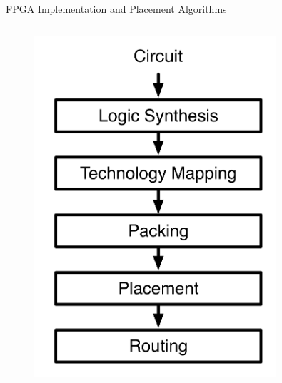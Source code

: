 \documentclass[10pt]{beamer}
\begin{document}
\begin{frame}{FPGA Implementation and Placement Algorithms}

  \begin{columns}[T, onlytextwidth]

      \begin{figure}
        \includegraphics[width=0.8\textwidth]{img/cad.png}
      \end{figure}



\end{columns}
\end{frame}
\end{document}
